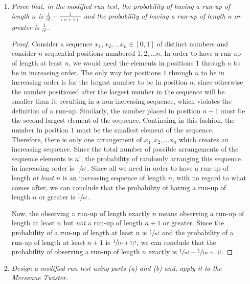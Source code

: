 \documentclass{article}
\begin{document}
\begin{enumerate}
\begin{enumerate}
            \item
                {\it Prove that, in the modified run test, the probability of having a run-up of length $n$ is $\frac{1}{n!} - \frac{1}{(n+1)!}$
                and the probability of having a run-up of length $n$ or greater is $\frac{1}{n!}$.}
                \begin{proof}
                    Consider a sequence $x_1, x_2, \dots x_n \in [0, 1]$ of distinct numbers and consider $n$ sequential positions numbered $1, 2, \dots n$.
                    In order to have a run-up of length at least $n$, we would need the elements in positions $1$ through $n$ to be in increasing order.
                    The only way for positions $1$ through $n$ to be in increasing order is for the largest number to be in position $n$,
                    since otherwise the number positioned after the largest number in the sequence will be smaller than it, resulting in a non-increasing sequence,
                    which violates the definition of a run-up.
                    Similarly, the number placed in position $n-1$ must be the second-largest element of the sequence.
                    Continuing in this fashion, the number in position $1$ must be the smallest element of the sequence.
                    Therefore, there is only one arrangement of $x_1, x_2, \dots x_n$ which creates an increasing sequence.
                    Since the total number of possible arrangements of the sequence elements is $n!$,
                    the probability of randomly arranging this sequence in increasing order is $\sfrac{1}{n!}$.
                    Since all we need in order to have a run-up of length {\it at least} $n$ is an increasing sequence of length $n$, with no regard to what comes after,
                    we can conclude that the probability of having a run-up of length $n$ or greater is $\sfrac{1}{n!}$.

                    Now, the observing a run-up of length exactly $n$ means observing a run-up of length at least $n$ but {\it not} a run-up of length $n+1$ or greater.
                    Since the probability of a run-up of length at least $n$ is $\sfrac{1}{n!}$ and the probability of a run-up of length at least $n+1$ is $\sfrac{1}{(n+1)!}$,
                    we can conclude that the probability of observing a run-up of length $n$ exactly is $\sfrac{1}{n!} - \sfrac{1}{(n+1)!}$.

                \end{proof}
            \item
                {\it Design a modified run test using parts (a) and (b) and, apply it to the Mersenne Twister.}


\end{enumerate}
\end{enumerate}
\end{document}
